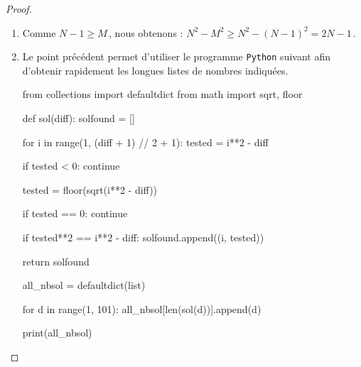 \begin{proof}
	\leavevmode
	
	\vspace{-1ex}
	\begin{enumerate}
		\item Comme $N - 1 \geq M$\,, nous obtenons :
		$N^2 - M^2 \geq N^2 - (N - 1)^2 = 2N - 1$\,.

		\item Le point précédent permet d'utiliser le programme \verb#Python# suivant afin d'obtenir rapidement les longues listes de nombres indiquées.

\bgroup
\small
\begin{Python}
from collections import defaultdict
from math import sqrt, floor

def sol(diff):
    solfound = []

    for i in range(1, (diff + 1) // 2 + 1):
        tested = i**2 - diff

        if tested < 0:
            continue

        tested = floor(sqrt(i**2 - diff))

        if tested == 0:
            continue

        if tested**2 == i**2 - diff:
            solfound.append((i, tested))

    return solfound

all_nbsol = defaultdict(list)

for d in range(1, 101):
    all_nbsol[len(sol(d))].append(d)

print(all_nbsol)
\end{Python}
\egroup	

		\qedhere
	\end{enumerate}
\end{proof}

	
%
%
%
%
%
%
%
